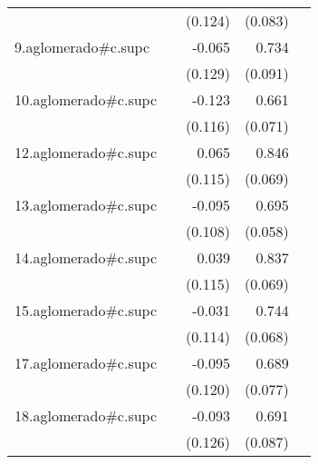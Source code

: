 {\begin{longtable}{l*{4}{D{.}{.}{-1}}}
            &                     &     (0.124)         &     (0.083)         &                     \\
\addlinespace
9.aglomerado#c.supc&                     &      -0.065         &       0.734\sym{***}&                     \\
            &                     &     (0.129)         &     (0.091)         &                     \\
\addlinespace
10.aglomerado#c.supc&                     &      -0.123         &       0.661\sym{***}&                     \\
            &                     &     (0.116)         &     (0.071)         &                     \\
\addlinespace
12.aglomerado#c.supc&                     &       0.065         &       0.846\sym{***}&                     \\
            &                     &     (0.115)         &     (0.069)         &                     \\
\addlinespace
13.aglomerado#c.supc&                     &      -0.095         &       0.695\sym{***}&                     \\
            &                     &     (0.108)         &     (0.058)         &                     \\
\addlinespace
14.aglomerado#c.supc&                     &       0.039         &       0.837\sym{***}&                     \\
            &                     &     (0.115)         &     (0.069)         &                     \\
\addlinespace
15.aglomerado#c.supc&                     &      -0.031         &       0.744\sym{***}&                     \\
            &                     &     (0.114)         &     (0.068)         &                     \\
\addlinespace
17.aglomerado#c.supc&                     &      -0.095         &       0.689\sym{***}&                     \\
            &                     &     (0.120)         &     (0.077)         &                     \\
\addlinespace
18.aglomerado#c.supc&                     &      -0.093         &       0.691\sym{***}&                     \\
            &                     &     (0.126)         &     (0.087)         &                     \\

\end{longtable}}
